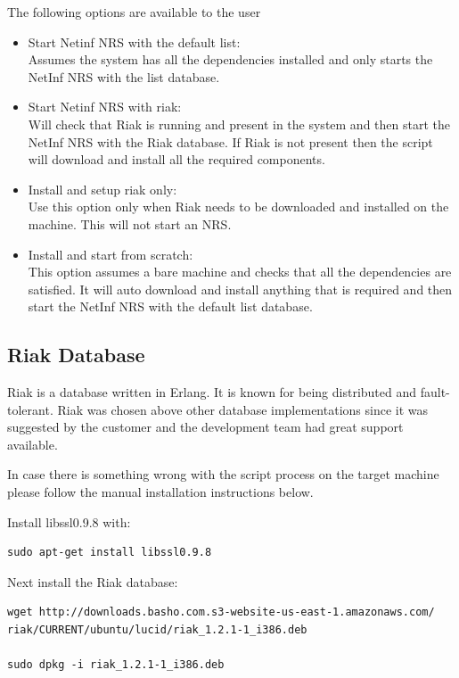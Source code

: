 The following options are available to the user

\begin{itemize}
\item Start Netinf NRS with the default list:\\
Assumes the system has all the dependencies installed and only starts the NetInf NRS with the list database.
\item Start Netinf NRS with riak:\\
Will check that Riak is running and present in the system and then start the NetInf NRS with the Riak database.
If Riak is not present then the script will download and install all the required components. 
\item Install and setup riak only:\\
Use this option only when Riak needs to be downloaded and installed on the machine. This will not start an NRS.
\item Install and start from scratch:\\
This option assumes a bare machine and checks that all the dependencies are satisfied. It will auto download and install anything that is required and then start the NetInf NRS with the default list database. 
\end{itemize}


\subsection{Riak Database}

Riak is a database written in Erlang. It is known for being distributed and fault-tolerant. Riak was chosen above other database implementations since it was suggested by the customer and the development team had great support available. 

In case there is something wrong with the script process on the target machine please follow the manual installation instructions below.

Install libssl0.9.8 with:
\begin {verbatim}
sudo apt-get install libssl0.9.8
\end{verbatim}

Next install the Riak database:
\begin{verbatim}
wget http://downloads.basho.com.s3-website-us-east-1.amazonaws.com/
riak/CURRENT/ubuntu/lucid/riak_1.2.1-1_i386.deb

sudo dpkg -i riak_1.2.1-1_i386.deb
\end{verbatim}

